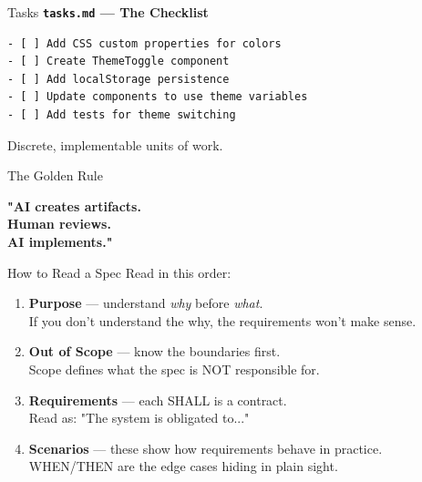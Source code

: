\documentclass[aspectratio=169,18pt]{beamer}
\begin{document}
\begin{frame}[fragile]{Tasks}
  \textbf{\texttt{tasks.md} — The Checklist}\\[0.5em]
\begin{lstlisting}
- [ ] Add CSS custom properties for colors
- [ ] Create ThemeToggle component
- [ ] Add localStorage persistence
- [ ] Update components to use theme variables
- [ ] Add tests for theme switching
\end{lstlisting}
  \vspace{0.5em}
  Discrete, implementable units of work.
\end{frame}

\begin{frame}{The Golden Rule}
  \vspace{2em}
  \begin{center}
    {\Large\textbf{"AI creates artifacts.}}\\[0.5em]
    {\Large\textbf{Human reviews.}}\\[0.5em]
    {\Large\textbf{AI implements."}}
  \end{center}
\end{frame}


\begin{frame}{How to Read a Spec}
  \vspace{0.3em}
  Read in this order:
  \begin{enumerate}\setlength\itemsep{0.5em}
    \item \textbf{Purpose} — understand \textit{why} before \textit{what}.\\
      \small\color{opengray}If you don't understand the why, the requirements won't make sense.\normalsize
    \item \textbf{Out of Scope} — know the boundaries first.\\
      \small\color{opengray}Scope defines what the spec is NOT responsible for.\normalsize
    \item \textbf{Requirements} — each SHALL is a contract.\\
      \small\color{opengray}Read as: "The system is obligated to..."\normalsize
    \item \textbf{Scenarios} — these show how requirements behave in practice.\\
      \small\color{opengray}WHEN/THEN are the edge cases hiding in plain sight.\normalsize
  \end{enumerate}
\end{frame}
\end{document}
